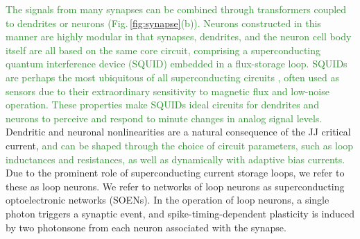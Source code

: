 \documentclass[twocolumn]{article}
\begin{document}
\textcolor{ForestGreen}{The signals from many synapses can be combined through transformers coupled to dendrites or neurons (Fig.\,\ref{fig:synapse}(b)). Neurons constructed in this manner are highly modular in that synapses, dendrites, and the neuron cell body itself are all based on the same core circuit, comprising a superconducting quantum interference device (SQUID) embedded in a flux-storage loop. SQUIDs are perhaps the most ubiquitous of all superconducting circuits \cite{vatu1998,ka1999}, often used as sensors due to their extraordinary sensitivity to magnetic flux and low-noise operation. These properties make SQUIDs ideal circuits for dendrites and neurons to perceive and respond to minute changes in analog signal levels.} Dendritic and neuronal nonlinearities are a natural consequence of the JJ critical current, \textcolor{ForestGreen}{and can be shaped through the choice of circuit parameters, such as loop inductances and resistances, as well as dynamically with adaptive bias currents.} Due to the prominent role of superconducting current storage loops, we refer to these as loop neurons. We refer to networks of loop neurons as superconducting optoelectronic networks (SOENs). In the operation of loop neurons, a single photon triggers a synaptic event, and spike-timing-dependent plasticity is induced by two photons\textemdash one from each neuron associated with the synapse.
\begin{figure}
\end{figure}
\end{document}
